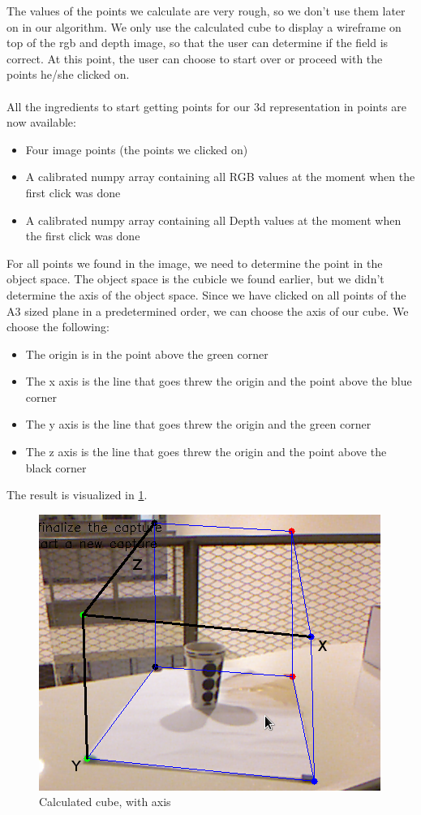 The values of the points we calculate are very rough, so we don't use them later on in our algorithm. We only use the calculated cube to display a wireframe on top of the rgb and depth image, so that the user can determine if the field is correct. At this point, the user can choose to start over or proceed with the points he/she clicked on. \\
\\
All the ingredients to start getting points for our 3d representation in points are now available:\\
\begin{itemize}
\item Four image points (the points we clicked on)
\item A calibrated numpy array containing all RGB values at the moment when the first click was done
\item A calibrated numpy array containing all Depth values at the moment when the first click was done
\end{itemize}
For all points we found in the image, we need to determine the point in the object space. The object space is the cubicle we found earlier, but we didn't determine the axis of the object space. Since we have clicked on all points of the A3 sized plane in a predetermined order, we can choose the axis of our cube. We choose the following: 
\begin{itemize}
\item The origin is in the point above the green corner
\item The x axis is the line that goes threw the origin and the point above the blue corner
\item The y axis is the line that goes threw the origin and the green corner
\item The z axis is the line that goes threw the origin and the point above the black corner
\end{itemize}
The result is visualized in \ref{fig:axis}. 
\begin{figure}[H]
\centering
\includegraphics[scale=0.5]{images/axis.png}
\caption{Calculated cube, with axis}
\label{fig:axis}
\end{figure}
